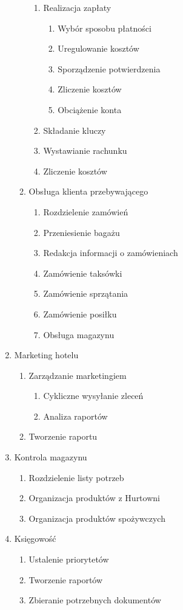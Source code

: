 \documentclass[a4paper, 11pt]{article}
\begin{document}
\begin{enumerate}[label*=\arabic*.]
\begin{enumerate}[label*=\arabic*.]
\begin{enumerate}[label*=\arabic*.]
				\item Realizacja zapłaty
				\begin{enumerate}[label*=\arabic*.]
					\item Wybór sposobu płatności
					\item Uregulowanie kosztów
					\item Sporządzenie potwierdzenia
					\item Zliczenie kosztów
					\item Obciążenie konta
				\end{enumerate}													
				\item Składanie kluczy
				\item Wystawianie rachunku
				\item Zliczenie kosztów
			\end{enumerate}						
			\item Obsługa klienta przebywającego
			\begin{enumerate}[label*=\arabic*.]
				\item Rozdzielenie zamówień
				\item Przeniesienie bagażu
				\item Redakcja informacji o zamówieniach
				\item Zamówienie taksówki
				\item Zamówienie sprzątania
				\item Zamówienie posiłku
				\item Obsługa magazynu
			\end{enumerate}						
		\end{enumerate}
		\item Marketing hotelu
		\begin{enumerate}[label*=\arabic*.]
			\item Zarządzanie marketingiem
			\begin{enumerate}[label*=\arabic*.]
				\item Cykliczne wysyłanie zleceń
				\item Analiza raportów
			\end{enumerate}	
			\item Tworzenie raportu
		\end{enumerate}		
		\item Kontrola magazynu
		\begin{enumerate}[label*=\arabic*.]
			\item Rozdzielenie listy potrzeb
			\item Organizacja produktów z Hurtowni
			\item Organizacja produktów spożywczych
		\end{enumerate}	
		\item Księgowość
		\begin{enumerate}[label*=\arabic*.]
			\item Ustalenie priorytetów
			\item Tworzenie raportów
			\item Zbieranie potrzebnych dokumentów
		\end{enumerate}	
	\end{enumerate}
\end{document}

